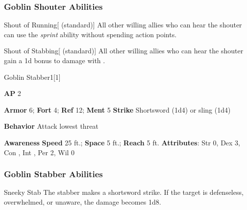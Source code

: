 \subsubsection{Goblin Shouter Abilities}

\begin{ability}{Shout of Running}[ (standard)]
All other willing allies who can hear the shouter can use the \textit{sprint} ability without spending action points.
\end{ability}

\vspace{0.5em}
\begin{ability}{Shout of Stabbing}[ (standard)]
All other willing allies who can hear the shouter gain a \plus1d bonus to damage with .
\end{ability}

\begin{monsection}{Goblin Stabber}{1}[1]
\vspace{-1em}\vspace{-1em}
\begin{spellcontent}
\begin{spelltargetinginfo}
{\textbf{AP} 2}

\pari \textbf{Armor} 6;
\textbf{Fort} 4;
\textbf{Ref} 12;
\textbf{Ment} 5
\pari \textbf{Strike} Shortsword  (1d4) or sling  (1d4)



\pari \textbf{Behavior} Attack lowest threat
\end{spelltargetinginfo}
\end{spellcontent}

\begin{monsterfooter}
\pari \textbf{Awareness} 
\pari \textbf{Speed} 25 ft.;
\textbf{Space} 5 ft.;
\textbf{Reach} 5 ft.
\pari \textbf{Attributes}:
Str 0,
Dex 3,
Con ,
Int ,
Per 2,
Wil 0
\end{monsterfooter}
\end{monsection}


\subsubsection{Goblin Stabber Abilities}

\begin{ability}{Sneeky Stab}
The stabber makes a shortsword strike.
If the target is defenseless, overwhelmed, or unaware, the damage becomes 1d8.
\end{ability}

